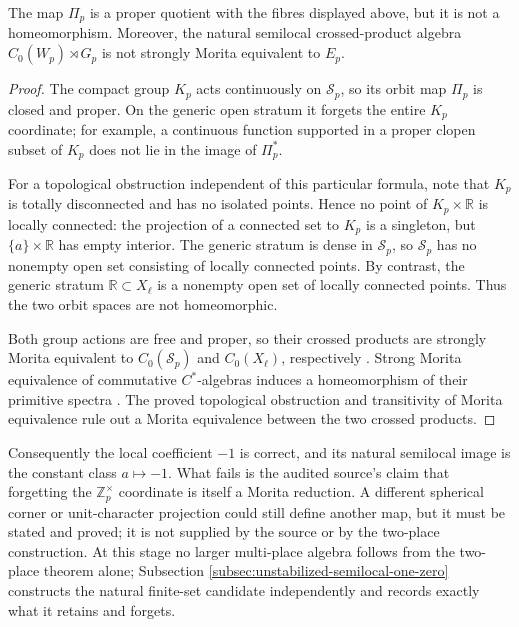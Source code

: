 \begin{proposition}
\label{prop:primitive-semilocal-morita-obstruction}
The map $\Pi_p$ is a proper quotient with the fibres displayed above, but it is
not a homeomorphism.  Moreover, the natural semilocal crossed-product algebra
$C_0(W_p)\rtimes G_p$ is not strongly Morita equivalent to $E_p$.
\end{proposition}

\begin{proof}
The compact group $K_p$ acts continuously on $\mathcal S_p$, so its orbit map
$\Pi_p$ is closed and proper.  On the generic open stratum it forgets the
entire $K_p$ coordinate; for example, a continuous function supported in a
proper clopen subset of $K_p$ does not lie in the image of $\Pi_p^*$.

For a topological obstruction independent of this particular formula, note
that $K_p$ is totally disconnected and has no isolated points.  Hence no point
of $K_p\times\mathbb R$ is locally connected: the projection of a connected
set to $K_p$ is a singleton, but $\{a\}\times\mathbb R$ has empty interior.
The generic stratum is dense in $\mathcal S_p$, so $\mathcal S_p$ has no
nonempty open set consisting of locally connected points.  By contrast, the
generic stratum $\mathbb R\subset X_\ell$ is a nonempty open set of locally
connected points.  Thus the two orbit spaces are not homeomorphic.

Both group actions are free and proper, so their crossed products are strongly
Morita equivalent to $C_0(\mathcal S_p)$ and $C_0(X_\ell)$, respectively
\cite[Theorem~1.3.22]{meslandSengun2025}.  Strong Morita equivalence of
commutative $C^*$-algebras induces a homeomorphism of their primitive spectra
\cite[p.~208]{green1978}.
The proved topological obstruction and transitivity of Morita equivalence rule
out a Morita equivalence between the two crossed products.
\end{proof}

Consequently the local coefficient $-1$ is correct, and its natural semilocal
image is the constant class $a\mapsto-1$.  What fails is the audited source's
claim that forgetting the $\mathbb Z_p^\times$ coordinate is itself a Morita
reduction.  A different spherical corner or unit-character projection could
still define another map, but it must be stated and proved; it is not supplied
by the source or by the two-place construction.  At this stage no larger
multi-place algebra follows from the two-place theorem alone; Subsection
\ref{subsec:unstabilized-semilocal-one-zero} constructs the natural finite-set
candidate independently and records exactly what it retains and forgets.

